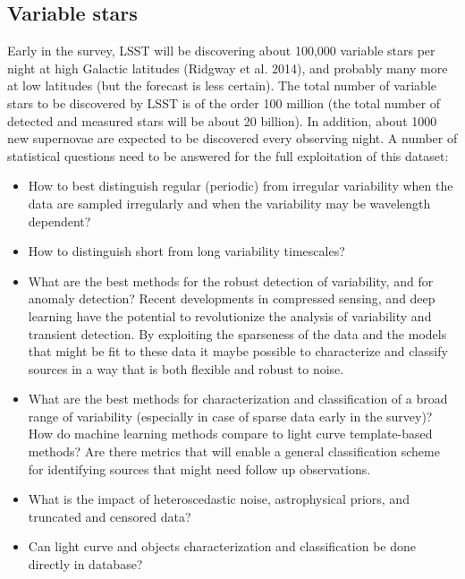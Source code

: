 \documentclass{iau}
\begin{document}
\subsection{Variable stars}

Early in the survey, LSST will be discovering about 100,000 variable
stars per night at high Galactic latitudes (Ridgway et al. 2014), and
probably many more at low latitudes (but the forecast is less
certain). The total number of variable stars to be discovered by LSST
is of the order 100 million (the total number of detected and measured
stars will be about 20 billion). In addition, about 1000 new
supernovae are expected to be discovered every observing night. A
number of statistical questions need to be answered for the full
exploitation of this dataset:
\begin{itemize}
\item How to best distinguish regular (periodic) from irregular
  variability when the data are sampled irregularly and when the
  variability may be wavelength dependent? 
\item How to distinguish short from long variability timescales? 
\item What are the best methods for the robust detection of
  variability, and for anomaly detection?  Recent developments in
  compressed sensing, and deep learning have the potential to
  revolutionize the analysis of variability and transient
  detection. By exploiting the sparseness of the data and the models
  that might be fit to these data it maybe possible to characterize
  and classify sources in a way that is both flexible and robust to
  noise.
\item What are the best methods for characterization and
  classification of a broad range of variability (especially in case
  of sparse data early in the survey)? How do machine learning methods
  compare to light curve template-based methods?  Are there metrics that will
  enable a general classification scheme for identifying sources that
  might need follow up observations.
\item What is the impact of heteroscedastic noise, astrophysical
  priors, and truncated and censored data?
\item Can light curve and objects characterization and classification be done directly in database?  
\end{itemize}

\end{document}
